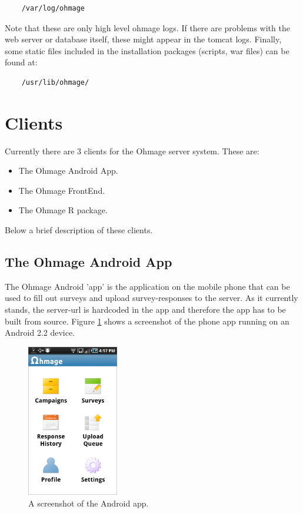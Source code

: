 \documentclass{scrartcl}
\begin{document}
\begin{verbatim}
    /var/log/ohmage
\end{verbatim}

\noindent Note that these are only high level ohmage logs. If there are problems
with the web server or database itself, these might appear in the tomcat logs. 
Finally, some static files included in the installation packages (scripts,
war files) can be found at:

\begin{verbatim}
    /usr/lib/ohmage/
\end{verbatim}

\section{Clients}

Currently there are 3 clients for the Ohmage server system. These are:

\begin{itemize}
  \item The Ohmage Android App.
  \item The Ohmage FrontEnd.
  \item The Ohmage R package.
\end{itemize}
Below a brief description of these clients.

\subsection{The Ohmage Android App}

The Ohmage Android 'app' is the application on the mobile phone that can be used
to fill out surveys and upload survey-responses to the server. As it currently
stands, the server-url is hardcoded in the app and therefore the app has to be
built from source. Figure \ref{fig:phone} shows a screenshot of the phone app running on
an Android 2.2 device. \\

\begin{figure}[h!]
\begin{center}
\includegraphics[width=4cm]{app.png}
\caption{A screenshot of the Android app.}
\label{fig:phone}
\end{center}
\end{figure}
\end{document}
